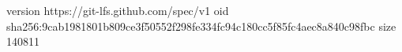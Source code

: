 version https://git-lfs.github.com/spec/v1
oid sha256:9cab1981801b809ce3f50552f298fe334fc94c180cc5f85fc4aec8a840c98fbc
size 140811
